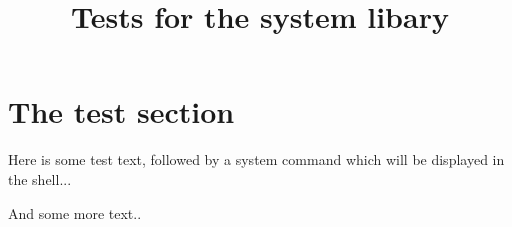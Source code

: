 \documentclass{webpage}
\begin{document}
\title{Tests for the system libary}

\section{The test section}
Here is some test text, followed by a system command which will be displayed in the shell...









And some more text..


\end{document}
